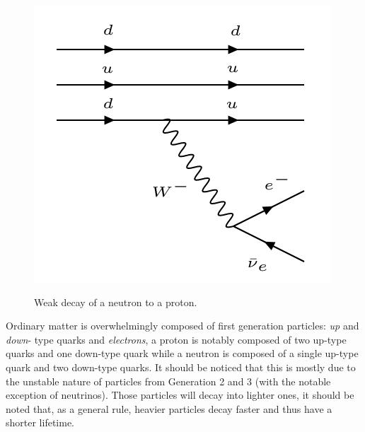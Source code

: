 \begin{figure}[htbp]
\centering
\includegraphics[width=0.5\linewidth]{./fig/betadecay.png}
\label{fig:betadecay}
\caption{Weak decay of a neutron to a proton.}
\end{figure}

Ordinary matter is overwhelmingly composed of first generation particles: \textit{up} and \textit{down}- type quarks and \textit{electrons}, a proton is notably composed of two up-type quarks and one down-type quark while a neutron is composed of a single up-type quark and two down-type quarks. It should be noticed that this is mostly due to the unstable nature of particles from Generation 2 and 3 (with the notable exception of neutrinos). Those particles will decay into lighter ones, it should be noted that, as a general rule, heavier particles decay faster and thus have a shorter lifetime. 

